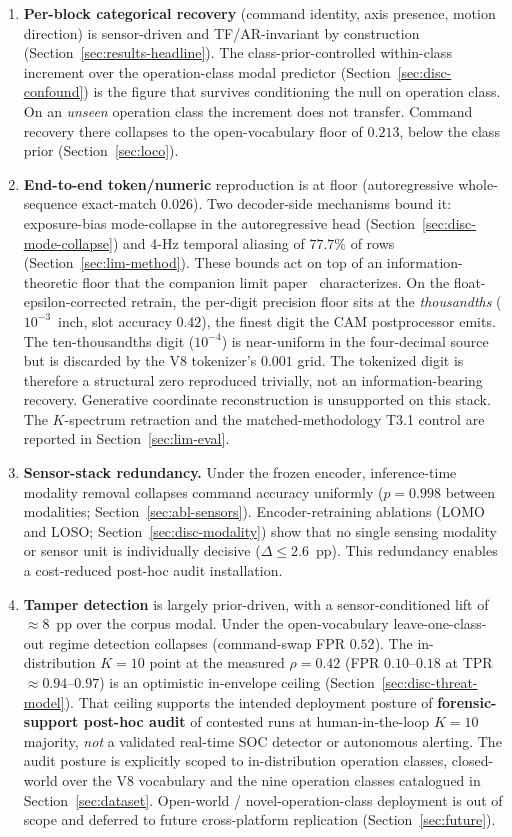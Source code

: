 \documentclass[sensors,article,submit,moreauthors,pdftex]{Definitions/mdpi}
\begin{document}
\begin{enumerate}[label=(\arabic*), leftmargin=*, nosep]
\item \textbf{Per-block categorical recovery} (command identity, axis presence, motion direction) is sensor-driven and TF/AR-invariant by construction (Section~\ref{sec:results-headline}). The class-prior-controlled within-class increment over the operation-class modal predictor (Section~\ref{sec:disc-confound}) is the figure that survives conditioning the null on operation class. On an \emph{unseen} operation class the increment does not transfer. Command recovery there collapses to the open-vocabulary floor of $0.213$, below the class prior (Section~\ref{sec:loco}).
\item \textbf{End-to-end token/numeric} reproduction is at floor (autoregressive whole-sequence exact-match $0.026$). Two decoder-side mechanisms bound it: exposure-bias mode-collapse in the autoregressive head (Section~\ref{sec:disc-mode-collapse}) and 4-Hz temporal aliasing of $77.7\%$ of rows (Section~\ref{sec:lim-method}). These bounds act on top of an information-theoretic floor that the companion limit paper~\cite{paperB_entropy} characterizes. On the float-epsilon-corrected retrain, the per-digit precision floor sits at the \emph{thousandths} ($10^{-3}$~inch, slot accuracy $0.42$), the finest digit the CAM postprocessor emits. The ten-thousandths digit ($10^{-4}$) is near-uniform in the four-decimal source but is discarded by the V8 tokenizer's $0.001$ grid. The tokenized digit is therefore a structural zero reproduced trivially, not an information-bearing recovery. Generative coordinate reconstruction is unsupported on this stack. The $K$-spectrum retraction and the matched-methodology T3.1 control are reported in Section~\ref{sec:lim-eval}.
\item \textbf{Sensor-stack redundancy.} Under the frozen encoder, inference-time modality removal collapses command accuracy uniformly ($p\!=\!0.998$ between modalities; Section~\ref{sec:abl-sensors}). Encoder-retraining ablations (LOMO and LOSO; Section~\ref{sec:disc-modality}) show that no single sensing modality or sensor unit is individually decisive ($\Delta\!\le\!2.6$~pp). This redundancy enables a cost-reduced post-hoc audit installation.
\item \textbf{Tamper detection} is largely prior-driven, with a sensor-conditioned lift of $\approx\!8$~pp over the corpus modal. Under the open-vocabulary leave-one-class-out regime detection collapses (command-swap FPR $0.52$). The in-distribution $K\!=\!10$ point at the measured $\rho\!=\!0.42$ (FPR $0.10$--$0.18$ at TPR $\approx\!0.94$--$0.97$) is an optimistic in-envelope ceiling (Section~\ref{sec:disc-threat-model}). That ceiling supports the intended deployment posture of \textbf{forensic-support post-hoc audit} of contested runs at human-in-the-loop $K\!=\!10$ majority, \emph{not} a validated real-time SOC detector or autonomous alerting. The audit posture is explicitly scoped to in-distribution operation classes, closed-world over the V8 vocabulary and the nine operation classes catalogued in Section~\ref{sec:dataset}. Open-world / novel-operation-class deployment is out of scope and deferred to future cross-platform replication (Section~\ref{sec:future}).

\end{enumerate}
\end{document}
